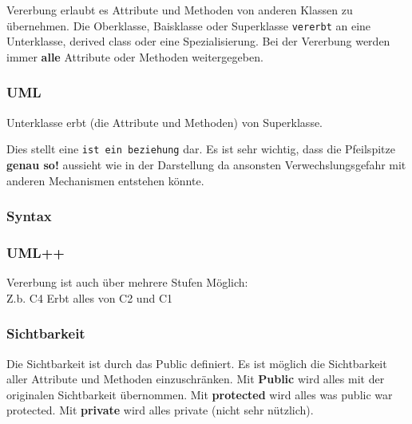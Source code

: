 Vererbung erlaubt es Attribute und Methoden von anderen Klassen zu übernehmen. 
Die Oberklasse, Baisklasse oder Superklasse \texttt{vererbt} an eine Unterklasse, derived class oder eine Spezialisierung. 
Bei der Vererbung werden immer \textbf{alle} Attribute oder Methoden weitergegeben. 

\subsubsection{UML}
\begin{minipage}{0.6\columnwidth}
    
\end{minipage}\hfill
    \begin{minipage}{0.35\columnwidth}
    Unterklasse erbt (die Attribute und Methoden) von Superklasse. 
\end{minipage}\vspace{1em}

Dies stellt eine \texttt{ist ein beziehung} dar. 
Es ist sehr wichtig, dass die Pfeilspitze \colorbox{red!65}{\textbf{genau so!}} aussieht wie in der Darstellung da ansonsten Verwechslungsgefahr mit anderen Mechanismen entstehen könnte.

\subsubsection{Syntax}



\subsubsection{UML++}


\hfill
\begin{minipage}[b]{0.45\columnwidth}
    Vererbung ist auch über mehrere Stufen Möglich:\\
    Z.b. C4 Erbt alles von C2 und C1
\end{minipage}

\subsubsection{Sichtbarkeit}

Die Sichtbarkeit ist durch das Public definiert. 
Es ist möglich die Sichtbarkeit aller Attribute und Methoden einzuschränken. 
Mit \textbf{Public} wird alles mit der originalen Sichtbarkeit übernommen. 
Mit \textbf{protected} wird alles was public war protected. 
Mit \textbf{private} wird alles private (nicht sehr nützlich).

